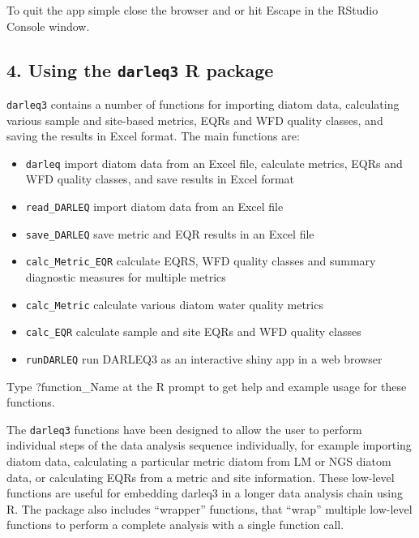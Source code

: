 \documentclass[]{article}
\providecommand{\tightlist}{%
  \setlength{\itemsep}{0pt}\setlength{\parskip}{0pt}}
\begin{document}
To quit the app simple close the browser and or hit Escape in the
RStudio Console window.

\hypertarget{using-the-darleq3-r-package}{%
\subsection{\texorpdfstring{4. Using the \texttt{darleq3} R
package}{4. Using the darleq3 R package}}\label{using-the-darleq3-r-package}}

\texttt{darleq3} contains a number of functions for importing diatom
data, calculating various sample and site-based metrics, EQRs and WFD
quality classes, and saving the results in Excel format. The main
functions are:

\begin{itemize}
\tightlist
\item
  \texttt{darleq} import diatom data from an Excel file, calculate
  metrics, EQRs and WFD quality classes, and save results in Excel
  format
\item
  \texttt{read\_DARLEQ} import diatom data from an Excel file
\item
  \texttt{save\_DARLEQ} save metric and EQR results in an Excel file
\item
  \texttt{calc\_Metric\_EQR} calculate EQRS, WFD quality classes and
  summary diagnostic measures for multiple metrics
\item
  \texttt{calc\_Metric} calculate various diatom water quality metrics
\item
  \texttt{calc\_EQR} calculate sample and site EQRs and WFD quality
  classes
\item
  \texttt{runDARLEQ} run DARLEQ3 as an interactive shiny app in a web
  browser
\end{itemize}

Type ?function\_Name at the R prompt to get help and example usage for
these functions.

The \texttt{darleq3} functions have been designed to allow the user to
perform individual steps of the data analysis sequence individually, for
example importing diatom data, calculating a particular metric diatom
from LM or NGS diatom data, or calculating EQRs from a metric and site
information. These low-level functions are useful for embedding darleq3
in a longer data analysis chain using R. The package also includes
``wrapper'' functions, that ``wrap'' multiple low-level functions to
perform a complete analysis with a single function call.
\end{document}
